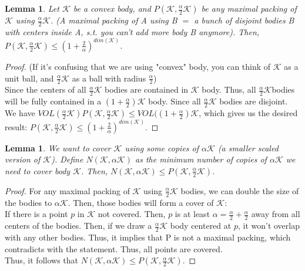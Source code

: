 \documentclass[11pt]{article}
\newtheorem{lemma}[theorem]{Lemma}
\begin{document}
\begin{lemma}
Let $\mathcal{K}$ be a convex body, and $P(\mathcal{K}, \frac{\alpha}{2} \mathcal{K})$ be any maximal packing of $\mathcal{K}$ using $ \frac{\alpha}{2} \mathcal{K}$. (A maximal packing of A using B $=$ a bunch of disjoint bodies B with centers inside A, s.t. you can't add more body B anymore). Then, $P(\mathcal{K}, \frac{\alpha}{2} \mathcal{K}) \leq (1+\frac{2}{\alpha})^{dim(\mathcal{K})}$. 
\end{lemma}
\begin{proof}
(If it's confusing that we are using "convex" body, you can think of $\mathcal{K}$ as a unit ball, and $\frac{\alpha}{2} \mathcal{K}$ as a ball with radius $\frac{\alpha}{2}$)\\
Since the centers of all $\frac{\alpha}{2} \mathcal{K}$ bodies are contained in $\mathcal{K}$ body. Thus, all $\frac{\alpha}{2} \mathcal{K} $bodies will be fully contained in  a $(1+\frac{\alpha}{2})\mathcal{K}$ body. Since all $\frac{\alpha}{2} \mathcal{K}$ bodies are disjoint. We have $VOL(\frac{\alpha}{2} \mathcal{K}) P(\mathcal{K}, \frac{\alpha}{2} \mathcal{K}) \leq VOL((1+\frac{\alpha}{2})\mathcal{K}$, which gives us the desired result: $P(\mathcal{K}, \frac{\alpha}{2} \mathcal{K}) \leq (1+\frac{2}{\alpha})^{dim(\mathcal{K})}$. 
\end{proof}

\begin{lemma}
We want to cover $\mathcal{K}$ using some copies of $\alpha \mathcal{K}$ (a smaller scaled version of $\mathcal{K}$). Define $N(\mathcal{K},\alpha \mathcal{K})$ as the minimum number of copies of $\alpha \mathcal{K}$ we need to cover body $\mathcal{K}$. Then, $N(\mathcal{K}, \alpha \mathcal{K}) \leq P(\mathcal{K}, \frac{\alpha}{2}\mathcal{K})$. 
\end{lemma}
\begin{proof}
For any maximal packing of $\mathcal{K}$ using $\frac{\alpha}{2}\mathcal{K}$ bodies, we can double the size of the bodies to $\alpha \mathcal{K}$. Then, those bodies will form a cover of $\mathcal{K}$:\\ 
If there is a point $p$ in $\mathcal{K}$ not covered. Then, $p$ is at least $\alpha = \frac{\alpha}{2} + \frac{\alpha}{2}$ away from all centers of the bodies. Then, if we draw a $\frac{\alpha}{2}\mathcal{K}$ body centered at $p$, it won't overlap with any other bodies. Thus, it implies that P is not a maximal packing, which contradicts with the statement. Thus, all points are covered.\\ 
Thus, it follows that $N(\mathcal{K}, \alpha \mathcal{K}) \leq P(\mathcal{K}, \frac{\alpha}{2}\mathcal{K})$. 
\end{proof}
\end{document}
